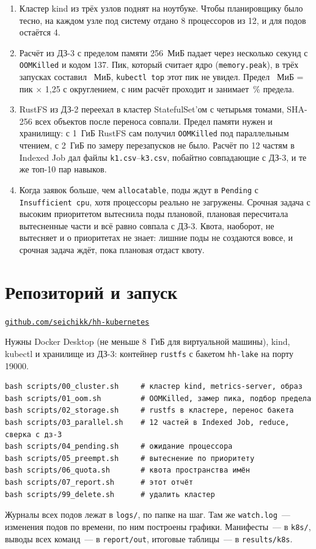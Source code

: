 \documentclass[11pt,a4paper]{article}
\newcommand{\repoUrl}{\texttt{github.com/seichikk/hh-kubernetes}}
\begin{document}
\begin{enumerate}
  \item Кластер kind из трёх узлов поднят на ноутбуке. Чтобы планировщику было тесно, на каждом узле под систему отдано 8 процессоров из 12, и для подов остаётся 4.
  \item Расчёт из ДЗ-3 с пределом памяти 256~МиБ падает через несколько секунд с \texttt{OOMKilled} и кодом 137. Пик, который считает ядро (\texttt{memory.peak}), в трёх запусках составил \wholePeaks~МиБ, \texttt{kubectl top} этот пик не увидел. Предел \wholeLimit~МиБ = пик $\times$ 1,25 с округлением, с ним расчёт проходит и занимает \wholeFinalPct\,\% предела.
  \item RustFS из ДЗ-2 переехал в кластер StatefulSet'ом с четырьмя томами, SHA-256 всех объектов после переноса совпали. Предел памяти нужен и хранилищу: с 1~ГиБ RustFS сам получил \texttt{OOMKilled} под параллельным чтением, с 2~ГиБ по замеру перезапусков не было. Расчёт по 12 частям в Indexed Job дал файлы \texttt{k1.csv}--\texttt{k3.csv}, побайтно совпадающие с ДЗ-3, и те же топ-10 пар навыков.
  \item Когда заявок больше, чем \texttt{allocatable}, поды ждут в \texttt{Pending} с \texttt{Insufficient cpu}, хотя процессоры реально не загружены. Срочная задача с высоким приоритетом вытеснила поды плановой, плановая пересчитала вытесненные части и всё равно совпала с ДЗ-3. Квота, наоборот, не вытесняет и о приоритетах не знает: лишние поды не создаются вовсе, и срочная задача ждёт, пока плановая отдаст квоту.
\end{enumerate}

\appendix
\section{Репозиторий и запуск}

\begin{center}\href{https://github.com/seichikk/hh-kubernetes}{\repoUrl}\end{center}

Нужны Docker Desktop (не меньше 8~ГиБ для виртуальной машины), kind, kubectl и хранилище из ДЗ-3: контейнер \texttt{rustfs} с бакетом \texttt{hh-lake} на порту 19000.

\begin{Verbatim}[fontsize=\small,frame=single]
bash scripts/00_cluster.sh     # кластер kind, metrics-server, образ
bash scripts/01_oom.sh         # OOMKilled, замер пика, подбор предела
bash scripts/02_storage.sh     # rustfs в кластере, перенос бакета
bash scripts/03_parallel.sh    # 12 частей в Indexed Job, reduce, сверка с дз-3
bash scripts/04_pending.sh     # ожидание процессора
bash scripts/05_preempt.sh     # вытеснение по приоритету
bash scripts/06_quota.sh       # квота пространства имён
bash scripts/07_report.sh      # этот отчёт
bash scripts/99_delete.sh      # удалить кластер
\end{Verbatim}

Журналы всех подов лежат в \texttt{logs/}, по папке на шаг. Там же \texttt{watch.log}~--- изменения подов по времени, по ним построены графики. Манифесты~--- в \texttt{k8s/}, выводы всех команд~--- в \texttt{report/out}, итоговые таблицы~--- в \texttt{results/k8s}.
\end{document}
